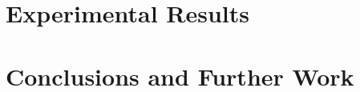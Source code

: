 \documentclass{llncs}
\begin{document}

\section{Experimental Results}
\label{sec:results}



\section{Conclusions and Further Work}
\label{sec:conclusions}







\end{document}
